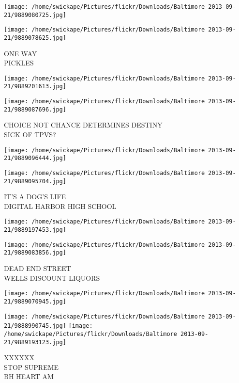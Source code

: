 \documentclass[10pt,letterpaper]{article}
\begin{document}
\texttt{[image: /home/swickape/Pictures/flickr/Downloads/Baltimore 2013-09-21/9889080725.jpg]}

\vspace{0.25in}
\texttt{[image: /home/swickape/Pictures/flickr/Downloads/Baltimore 2013-09-21/9889078625.jpg]}

ONE WAY\\
PICKLES
\pagebreak

\texttt{[image: /home/swickape/Pictures/flickr/Downloads/Baltimore 2013-09-21/9889201613.jpg]}

\vspace{0.25in}
\texttt{[image: /home/swickape/Pictures/flickr/Downloads/Baltimore 2013-09-21/9889087696.jpg]}

CHOICE NOT CHANCE DETERMINES DESTINY\\
SICK OF TPVS?
\pagebreak

\texttt{[image: /home/swickape/Pictures/flickr/Downloads/Baltimore 2013-09-21/9889096444.jpg]}

\vspace{0.25in}
\texttt{[image: /home/swickape/Pictures/flickr/Downloads/Baltimore 2013-09-21/9889095704.jpg]}

IT'S A DOG'S LIFE\\
DIGITAL HARBOR HIGH SCHOOL
\pagebreak

\texttt{[image: /home/swickape/Pictures/flickr/Downloads/Baltimore 2013-09-21/9889197453.jpg]}

\vspace{0.25in}
\texttt{[image: /home/swickape/Pictures/flickr/Downloads/Baltimore 2013-09-21/9889083856.jpg]}

DEAD END STREET\\
WELLS DISCOUNT LIQUORS
\pagebreak

\texttt{[image: /home/swickape/Pictures/flickr/Downloads/Baltimore 2013-09-21/9889070945.jpg]}

\vspace{0.25in}
\texttt{[image: /home/swickape/Pictures/flickr/Downloads/Baltimore 2013-09-21/9888990745.jpg]}
\texttt{[image: /home/swickape/Pictures/flickr/Downloads/Baltimore 2013-09-21/9889193123.jpg]}

XXXXXX\\
STOP SUPREME\\
BH HEART AM
\pagebreak
\end{document}
